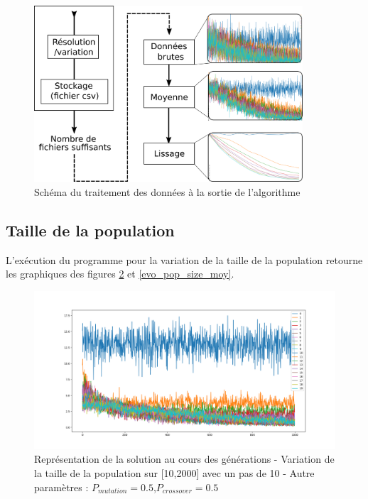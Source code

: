 \documentclass[12pt]{report}
\begin{document}
          \begin{figure}[!]
            \centering
            \includegraphics[width=10cm]{img/logigramme.png}
            \caption{Schéma du traitement des données à la sortie de l'algorithme}
            \label{logi}
          \end{figure}


      \subsection{Taille de la population}
        L'exécution du programme pour la variation de la taille de la population retourne les graphiques des figures \ref{evo_pop_size_brut} et \ref{evo_pop_size_moy}.

        \begin{figure}[h]
          \centering
          \includegraphics[width=18cm]{img/evo_pop_size_brut.png}
          \caption{Représentation de la solution au cours des générations - Variation de la taille de la population sur [10,2000] avec un pas de 10 - Autre paramètres : $P_{mutation} = 0.5$,$P_{crossover} = 0.5$}
          \label{evo_pop_size_brut}
        \end{figure}
\end{document}
